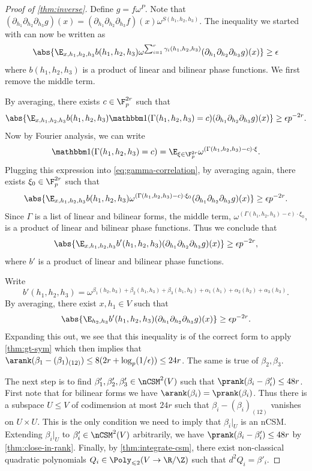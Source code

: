 \begin{proof}[Proof of \cref{thm:inverse}]
Define $g=f\omega^P$. Note that $(\partial_{h_1}\partial_{h_2}\partial_{h_3}g)(x)=(\partial_{h_1}\partial_{h_2}\partial_{h_3}f)(x)\omega^{S(h_1,h_2,h_3)}$. The inequality we started with can now be written as
\[\abs{\E_{x,h_1,h_2,h_3}b(h_1,h_2,h_3)\omega^{\sum_{i=1}^r\gamma_i(h_1,h_2,h_3)}(\partial_{h_1}\partial_{h_2}\partial_{h_3}g)(x)}\geq \epsilon\]
where $b(h_1,h_2,h_3)$ is a product of linear and bilinear phase functions. We first remove the middle term.

By averaging, there exists $c\in\F_p^{2r}$ such that
\begin{equation}
\label{eq:gamma-correlation}
\abs{\E_{x,h_1,h_2,h_3}b(h_1,h_2,h_3)\mathbbm1(\Gamma(h_1,h_2,h_3)=c)(\partial_{h_1}\partial_{h_2}\partial_{h_3}g)(x)}\geq \epsilon p^{-2r}.
\end{equation}
Now by Fourier analysis, we can write
\[\mathbbm1(\Gamma(h_1,h_2,h_3)=c)=\E_{\xi\in\F_p^{2r}}\omega^{(\Gamma(h_1,h_2,h_3)-c)\cdot \xi}.\] Plugging this expression into \cref{eq:gamma-correlation}, by averaging again, there exists $\xi_0\in\F_p^{2r}$ such that 
\[\abs{\E_{x,h_1,h_2,h_3}b(h_1,h_2,h_3)\omega^{(\Gamma(h_1,h_2,h_3)-c)\cdot\xi_0}(\partial_{h_1}\partial_{h_2}\partial_{h_3}g)(x)}\geq \epsilon p^{-2r}.\] Since $\Gamma$ is a list of linear and bilinear forms, the middle term, $\omega^{(\Gamma(h_1,h_2,h_3)-c)\cdot\xi_0}$, is a product of linear and bilinear phase functions. Thus we conclude that \[\abs{\E_{x,h_1,h_2,h_3}b'(h_1,h_2,h_3)(\partial_{h_1}\partial_{h_2}\partial_{h_3}g)(x)}\geq \epsilon p^{-2r},\]where $b'$ is a product of linear and bilinear phase functions.

Write \[b'(h_1,h_2,h_3)=\omega^{\beta_1(h_2,h_3)+\beta_2(h_1,h_3)+\beta_3(h_1,h_2)+\alpha_1(h_1)+\alpha_2(h_2)+\alpha_3(h_3)}.\] By averaging, there exist $x,h_1\in V$ such that
\[\abs{\E_{h_2,h_3}b'(h_1,h_2,h_3)(\partial_{h_1}\partial_{h_2}\partial_{h_3}g)(x)}\geq \epsilon p^{-2r}.\] Expanding this out, we see that this inequality is of the correct form to apply \cref{thm:gt-sym} which then implies that $\arank(\beta_1-(\beta_1)_{(12)})\leq 8(2r+\log_p(1/\epsilon))\leq 24r$. The same is true of $\beta_2,\beta_3$.

The next step is to find $\beta'_1,\beta'_2,\beta'_3\in\nCSM^2(V)$ such that $\prank(\beta_i-\beta'_i)\leq 48r$. First note that for bilinear forms we have $\arank(\beta_i)=\prank(\beta_i)$. Thus there is a subspace $U\leq V$ of codimension at most $24r$ such that $\beta_i-(\beta_i)_{(12)}$ vanishes on $U\times U$. This is the only condition we need to imply that $\beta_i|_U$ is an nCSM. Extending $\beta_i|_U$ to $\beta_i'\in\nCSM^2(V)$ arbitrarily, we have $\prank(\beta_i-\beta_i')\leq 48r$ by \cref{thm:close-in-rank}. Finally, by \cref{thm:integrate-csm}, there exist non-classical quadratic polynomials $Q_i\in\Poly_{\leqslant 2}(V\to\R/\Z)$ such that $d^2Q_i=\beta'_i$.


\end{proof}
